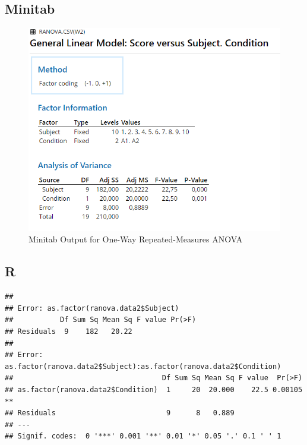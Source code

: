 \documentclass[
]{book}
\newenvironment{Shaded}{\begin{snugshade}}{\end{snugshade}}
\newcommand{\DataTypeTok}[1]{\textcolor[rgb]{0.13,0.29,0.53}{#1}}
\newcommand{\KeywordTok}[1]{\textcolor[rgb]{0.13,0.29,0.53}{\textbf{#1}}}
\newcommand{\NormalTok}[1]{#1}
\newcommand{\OperatorTok}[1]{\textcolor[rgb]{0.81,0.36,0.00}{\textbf{#1}}}
\newcommand{\StringTok}[1]{\textcolor[rgb]{0.31,0.60,0.02}{#1}}
\begin{document}
\hypertarget{minitab-3}{%
\subsection{Minitab}\label{minitab-3}}

\begin{figure}[!h]
\includegraphics{Screenshots/Repeated Measures ANOVA/ranovaMinitab} \caption{\label{fig:ranovaMinitab}Minitab Output for One-Way Repeated-Measures ANOVA}\label{fig:ranovaMinitab}
\end{figure}

\hypertarget{r-3}{%
\subsection{R}\label{r-3}}

\begin{Shaded}
\end{Shaded}

\begin{verbatim}
## 
## Error: as.factor(ranova.data2$Subject)
##           Df Sum Sq Mean Sq F value Pr(>F)
## Residuals  9    182   20.22               
## 
## Error: as.factor(ranova.data2$Subject):as.factor(ranova.data2$Condition)
##                                   Df Sum Sq Mean Sq F value  Pr(>F)   
## as.factor(ranova.data2$Condition)  1     20  20.000    22.5 0.00105 **
## Residuals                          9      8   0.889                   
## ---
## Signif. codes:  0 '***' 0.001 '**' 0.01 '*' 0.05 '.' 0.1 ' ' 1
\end{verbatim}
\end{document}
